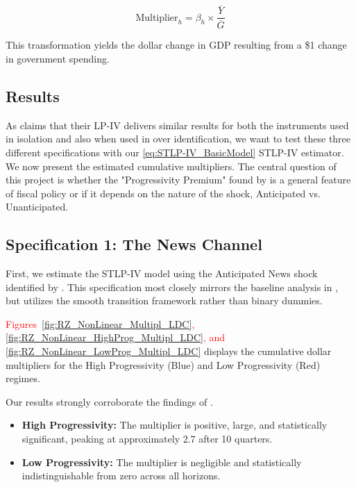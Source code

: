 \documentclass[12pt,letterpaper]{article}
\begin{document}
\begin{equation}
    \text{Multiplier}_h = \beta_h \times \frac{\overline{Y}}{\overline{G}}
\end{equation}

This transformation yields the dollar change in GDP resulting from a \$1 change in government spending.

\subsection{Results}
As \cite{FN} claims that their LP-IV delivers similar results for both the instruments used in isolation and also when  used in over identification, we want to test these three different specifications with our \eqref{eq:STLP-IV_BasicModel} STLP-IV estimator.
\\
We now present the estimated cumulative multipliers. The central question of this project is whether the "Progressivity Premium" found by \cite{FN} is a general feature of fiscal policy or if it depends on the nature of the shock, Anticipated vs. Unanticipated.

\subsection{Specification 1: The News Channel}
First, we estimate the STLP-IV model using the Anticipated News shock identified by \cite{RameyZubairy2018}. This specification most closely mirrors the baseline analysis in \cite{FN}, but utilizes the smooth transition framework rather than binary dummies.

\textcolor{red}{Figures~\ref{fig:RZ_NonLinear_Multipl_LDC},
\ref{fig:RZ_NonLinear_HighProg_Multipl_LDC}, and \ref{fig:RZ_NonLinear_LowProg_Multipl_LDC} }displays the cumulative dollar multipliers for the High Progressivity (Blue) and Low Progressivity (Red) regimes.

Our results strongly corroborate the findings of \cite{FN}. 
\begin{itemize}
    \item \textbf{High Progressivity:} The multiplier is positive, large, and statistically significant, peaking at approximately 2.7 after 10 quarters.
    \item \textbf{Low Progressivity:} The multiplier is negligible and statistically indistinguishable from zero across all horizons.
\end{itemize}
\end{document}
